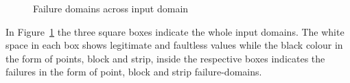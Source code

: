 \begin{figure} [H]
\centering
{}

\caption{Failure domains across input domain~\cite{chan1996proportional}}
\label{fig:patterns2}
\end{figure}



In Figure~\ref{fig:patterns2} the three square boxes indicate the whole input domains. The white space in each box shows legitimate and faultless values while the black colour in the form of points, block and strip, inside the respective boxes indicates the failures in the form of point, block and strip failure-domains.

\newpage
